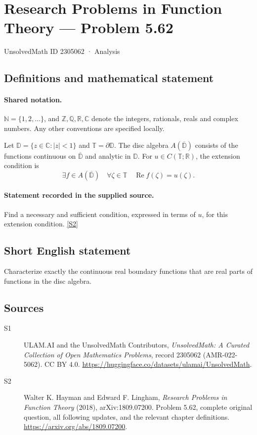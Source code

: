 \documentclass[11pt]{book}
\newcommand{\sref}[2]{\hyperlink{source:#1:#2}{[S#2]}}
\begin{document}
\setcounter{section}{2305061}
\section{Research Problems in Function Theory — Problem 5.62}\label{2305062}
{\small\sffamily UnsolvedMath ID 2305062 · Analysis}
\subsection{Definitions and mathematical statement}

\paragraph{Shared notation.}$\mathbb N=\{1,2,\ldots\}$, and $\mathbb Z,\mathbb Q,\mathbb R,\mathbb C$ denote the integers, rationals, reals and complex numbers. Any other conventions are specified locally.


Let $\mathbb D=\{z\in\mathbb C:|z|<1\}$ and $\mathbb T=\partial\mathbb D$. The disc algebra $A(\overline{\mathbb D})$ consists of the functions continuous on $\overline{\mathbb D}$ and analytic in $\mathbb D$. For $u\in C(\mathbb T;\mathbb R)$, the extension condition is \[\exists f\in A(\overline{\mathbb D})\quad\forall\zeta\in\mathbb T\quad\operatorname{Re}f(\zeta)=u(\zeta).\]
\paragraph{Statement recorded in the supplied source.}
Find a necessary and sufficient condition, expressed in terms of $u$, for this extension condition. \sref{2305062}{2}
\subsection{Short English statement}
Characterize exactly the continuous real boundary functions that are real parts of functions in the disc algebra.
\subsection{Sources}
\begin{description}
\item[\hypertarget{source:2305062:1}{S1}] ULAM.AI and the UnsolvedMath Contributors, \emph{UnsolvedMath: A Curated Collection of Open Mathematics Problems}, record 2305062 (AMR-022-5062). CC BY 4.0. \url{https://huggingface.co/datasets/ulamai/UnsolvedMath}.
\item[\hypertarget{source:2305062:2}{S2}] Walter K. Hayman and Edward F. Lingham, \emph{Research Problems in Function Theory} (2018), arXiv:1809.07200. Problem 5.62, complete original question, all following updates, and the relevant chapter definitions. \url{https://arxiv.org/abs/1809.07200}.
\end{description}
\label{end:2305062}
\end{document}
